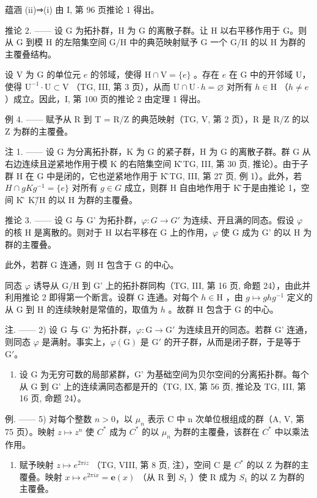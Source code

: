 蕴涵 (ii)⇒(i) 由 I, 第 96 页推论 1 得出。

推论 2. —— 设 G 为拓扑群，H 为 G 的离散子群。让 H 以右平移作用于 G。则从 G 到模 H 的左陪集空间 G/H 中的典范映射赋予 G 一个 G/H 的以 H 为群的主覆叠结构。

设 V 为 G 的单位元 \(e\) 的邻域，使得 \(\mathrm{H} \cap \mathrm{V} = \{e\}\) 。存在 \(e\) 在 G 中的开邻域 U，使得 \(\mathrm{U}^{-1} \cdot \mathrm{U} \subset \mathrm{V}\) （TG, III, 第 3 页），从而 \(\mathrm{U} \cap \mathrm{U} \cdot h = \varnothing\) 对所有 \(h \in \mathrm{H}\) （\(h \neq e\) ）成立。因此，I, 第 100 页的推论 2 由定理 1 得出。

例 4. —— 赋予从 R 到 T = R/Z 的典范映射（TG, V, 第 2 页），R 是 R/Z 的以 Z 为群的主覆叠。

注 1. —— 设 G 为分离拓扑群，K 为 G 的紧子群，H 为 G 的离散子群。群 G 从右边连续且逆紧地作用于模 K 的右陪集空间 K\G（TG, III, 第 30 页, 推论）。由于子群 H 在 G 中是闭的，它也逆紧地作用于 K\G（TG, III, 第 27 页, 例 1）。此外，若 \(H \cap gKg^{-1} = \{e\}\) 对所有 \(g \in G\) 成立，则群 H 自由地作用于 K\G。于是由推论 1，空间 K\G 是 K\G/H 的以 H 为群的主覆叠。

推论 3. —— 设 G 与 G' 为拓扑群，\(\varphi\colon G \to G'\) 为连续、开且满的同态。假设 \(\varphi\) 的核 H 是离散的。则对于 H 以右平移在 G 上的作用，\(\varphi\) 使 G 成为 G' 的以 H 为群的主覆叠。

此外，若群 G 连通，则 H 包含于 G 的中心。

同态 \(\varphi\) 诱导从 G/H 到 G' 上的拓扑群同构（TG, III, 第 16 页, 命题 24），由此并利用推论 2 即得第一个断言。设群 G 连通。对每个 \(h \in \mathrm{H}\) ，由 \(g \mapsto ghg^{-1}\) 定义的从 G 到 H 的连续映射是常值的，取值为 \(h\) 。故群 H 包含于 G 的中心。

注. —— 2) 设 G 与 G' 为拓扑群，\(\varphi\colon\mathrm{G}\to\mathrm{G}'\) 为连续且开的同态。若群 G' 连通，则同态 \(\varphi\) 是满射。事实上，\(\varphi(\mathrm{G})\) 是 \(\mathrm{G}'\) 的开子群，从而是闭子群，于是等于 \(\mathrm{G}'\)。

\begin{enumerate}
\def\labelenumi{\arabic{enumi})}
\setcounter{enumi}{2}
\tightlist
\item
  设 G 为无穷可数的局部紧群，G' 为基础空间为贝尔空间的分离拓扑群。每个从 G 到 G' 上的连续满同态都是开的（TG, IX, 第 56 页, 推论及 TG, III, 第 16 页, 命题 24）。
\end{enumerate}

例. —— 5) 对每个整数 \(n > 0\)，以 \(\mu_{n}\) 表示 C 中 n 次单位根组成的群（A, V, 第 75 页）。映射 \(z \mapsto z^{n}\) 使 \(C^{*}\) 成为 \(C^{*}\) 的以 \(\mu_{n}\) 为群的主覆叠，该群在 \(C^{*}\) 中以乘法作用。

\begin{enumerate}
\def\labelenumi{\arabic{enumi})}
\setcounter{enumi}{5}
\tightlist
\item
  赋予映射 \(z \mapsto e^{2\pi iz}\) （TG, VIII, 第 8 页, 注），空间 C 是 \(C^{*}\) 的以 Z 为群的主覆叠。映射 \(x \mapsto e^{2\pi ix} = \mathbf{e}(x)\) （从 R 到 \(S_{1}\) ）使 R 成为 \(S_{1}\) 的以 Z 为群的主覆叠。
\end{enumerate}

